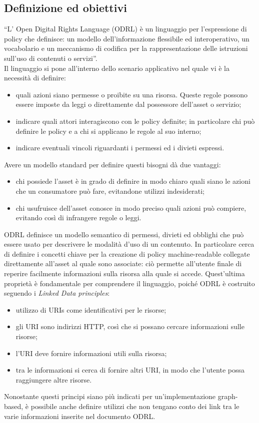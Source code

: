 \documentclass[12pt,a4paper,twoside]{book}
\begin{document}
\subsection{Definizione ed obiettivi}
``L' Open Digital Rights Language (ODRL) è un linguaggio per l'espressione di policy che definisce: un modello dell'informazione flessibile ed interoperativo, un vocabolario e un meccanismo di codifica per la rappresentazione delle istruzioni sull'uso di contenuti o servizi''\cite{ODRLinfMod}.\\
Il linguaggio si pone all'interno dello scenario applicativo nel quale vi è la necessità di definire:
\begin{itemize}
	\item quali azioni siano permesse o proibite su una risorsa. Queste regole possono essere imposte da leggi o direttamente dal possessore dell'asset o servizio;
	\item indicare quali attori interagiscono con le policy definite; in particolare chi può definire le policy e a chi si applicano le regole al suo interno;
	\item indicare eventuali vincoli riguardanti i permessi ed i divieti espressi.
\end{itemize}
Avere un modello standard per definire questi bisogni dà due vantaggi:
\begin{itemize}
	\item chi possiede l'asset è in grado di definire in modo chiaro quali siano le azioni che un consumatore può fare, evitandone utilizzi indesiderati;
	\item chi usufruisce dell'asset conosce in modo preciso quali azioni può compiere, evitando così di infrangere regole o leggi.
\end{itemize}
ODRL definisce un modello semantico di permessi, divieti ed obblighi che può essere usato per descrivere le modalità d'uso di un contenuto. In particolare cerca di definire i concetti chiave per la creazione di policy machine-readable collegate direttamente all'asset al quale sono associate: ciò permette all'utente finale di reperire facilmente informazioni sulla risorsa alla quale si accede. Quest'ultima proprietà è fondamentale per comprendere il linguaggio, poiché ODRL è costruito seguendo i \textit{Linked Data principles}\cite{LinkedDataInfo}:
\begin{itemize}\label{linkedDataPrinc}
\item utilizzo di URIs come identificativi per le risorse;
\item gli URI sono indirizzi HTTP, così che si possano cercare informazioni sulle risorse;
\item l'URI deve fornire informazioni utili sulla risorsa;
\item tra le informazioni si cerca di fornire altri URI, in modo che l'utente possa raggiungere altre risorse.
\end{itemize}
Nonostante questi principi siano più indicati per un'implementazione graph-based, è possibile anche definire utilizzi che non tengano conto dei link tra le varie informazioni inserite nel documento ODRL.
\end{document}
